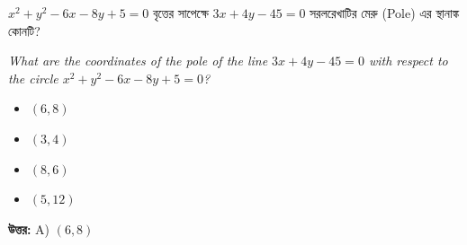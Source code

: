 \documentclass[12pt, a4paper]{article}
\begin{document}
\begin{tcolorbox}[questionbox={প্রশ্ন (Question) 19}]
    \noindent
    $x^2 + y^2 - 6x - 8y + 5 = 0$ বৃত্তের সাপেক্ষে $3x + 4y - 45 = 0$ সরলরেখাটির মেরু (Pole) এর স্থানাঙ্ক কোনটি?
    
    \vspace{0.8em}
    \begin{english}
    \noindent\textit{\color{darkgray}
    What are the coordinates of the pole of the line $3x + 4y - 45 = 0$ with respect to the circle $x^2 + y^2 - 6x - 8y + 5 = 0$?
    }
    \end{english}
\end{tcolorbox}

\begin{itemize}[label={}, leftmargin=1cm, itemsep=0.5em]
    \item[\textbf{A)}] $(6, 8)$
    \item[\textbf{B)}] $(3, 4)$
    \item[\textbf{C)}] $(8, 6)$
    \item[\textbf{D)}] $(5, 12)$
\end{itemize}

\vspace{0.5em}
\begin{tcolorbox}[answerbox]
    \textbf{\color{success} উত্তর:} A) $(6, 8)$
\end{tcolorbox}
\vspace{1em}
\end{document}
